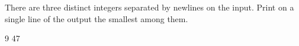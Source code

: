 




There are three distinct integers separated by newlines on the input. Print on a single line of the output the smallest among them.

9
47
\koniec

